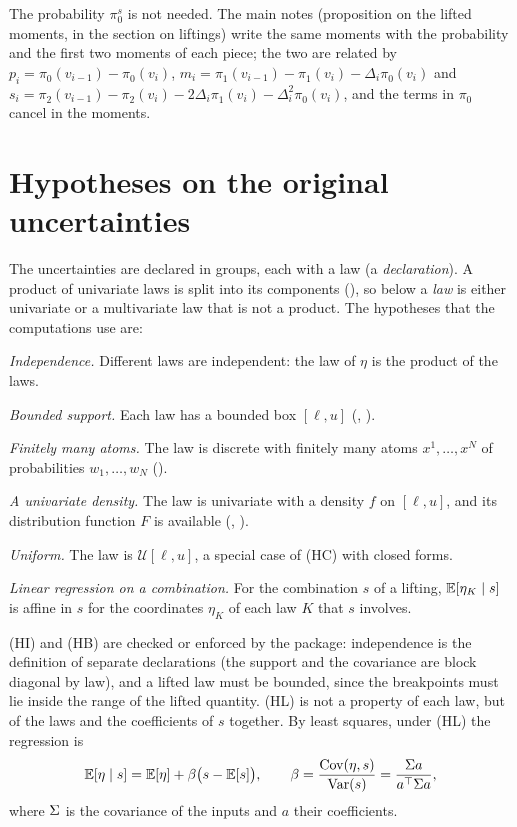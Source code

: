 \documentclass[11pt,a4paper]{article}
\numberwithin{equation}{section}
\newcommand{\slt}[2]{\pi^{#1}_{#2}}      %
\newcommand{\Var}{\operatorname{Var}}
\newcommand{\Hyp}[1]{\textup{(H#1)}}    %
\begin{document}
The probability $\slt s0$ is not needed.
The main notes (proposition on the lifted moments, in the section on liftings) write the same moments with the probability and the first two moments of each piece;
the two are related by
$p_i = \slt{}0(v_{i-1}) - \slt{}0(v_i)$,
$m_i = \slt{}1(v_{i-1}) - \slt{}1(v_i) - \Delta_i\slt{}0(v_i)$ and
$s_i = \slt{}2(v_{i-1}) - \slt{}2(v_i) - 2\Delta_i\slt{}1(v_i) - \Delta_i^2\slt{}0(v_i)$,
and the terms in $\slt{}0$ cancel in the moments.

\section{Hypotheses on the original uncertainties}
\label{sec:hypotheses}

The uncertainties are declared in groups, each with a law (a \emph{declaration}).
A product of univariate laws is split into its components (), so below a \emph{law} is either univariate or a multivariate law that is not a product.
The hypotheses that the computations use are:
\begin{description}[nosep,leftmargin=3em,labelwidth=2.5em]
\item[\Hyp{I}] \emph{Independence.} Different laws are independent: the law of $\eta$ is the product of the laws.
\item[\Hyp{B}] \emph{Bounded support.} Each law has a bounded box $[\ell, u]$ (, ).
\item[\Hyp{D}] \emph{Finitely many atoms.} The law is discrete with finitely many atoms $x^1, \dots, x^N$ of probabilities $w_1, \dots, w_N$ ().
\item[\Hyp{C}] \emph{A univariate density.} The law is univariate with a density $f$ on $[\ell, u]$, and its distribution function $F$ is available (, ).
\item[\Hyp{U}] \emph{Uniform.} The law is $\mathcal{U}[\ell, u]$, a special case of \Hyp{C} with closed forms.
\item[\Hyp{L}] \emph{Linear regression on a combination.} For the combination $s$ of a lifting, $\mathbb{E}[\eta_K \mid s]$ is affine in $s$ for the coordinates $\eta_K$ of each law $K$ that $s$ involves.
\end{description}

\Hyp{I} and \Hyp{B} are checked or enforced by the package:
independence is the definition of separate declarations (the support and the covariance are block diagonal by law),
and a lifted law must be bounded, since the breakpoints must lie inside the range of the lifted quantity.
\Hyp{L} is not a property of each law, but of the laws and the coefficients of $s$ together.
By least squares, under \Hyp{L} the regression is
\begin{equation}
\label{eq:regression}
\E[\eta \mid s] = \E[\eta] + \beta\bigl(s - \E[s]\bigr), \qquad \beta = \frac{\Cov(\eta, s)}{\Var(s)} = \frac{\Cv a}{a^\T\Cv a},
\end{equation}
where $\Sigma$ is the covariance of the inputs and $a$ their coefficients.
\end{document}
